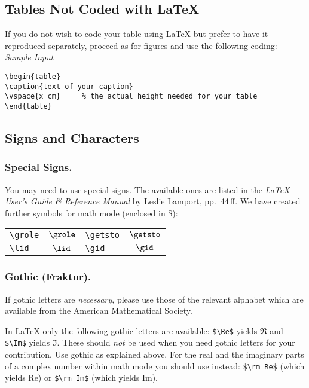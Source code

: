 \subsection{Tables Not Coded with \protect\LaTeX{}}
%
If you do not wish to code your table using \LaTeX{}
but prefer to have it reproduced separately,
proceed as for figures and use the following coding:\\[2mm]
{\it Sample Input}
\begin{verbatim}
\begin{table}
\caption{text of your caption}
\vspace{x cm}     % the actual height needed for your table
\end{table}
\end{verbatim}
%
\subsection{Signs and Characters}
%
\subsubsection*{Special Signs.}
%
You may need to use special signs.  The available ones are listed in the
{\em \LaTeX{} User's Guide \& Reference Manual\/} by Leslie Lamport,
pp.~44\,ff.
We have created further symbols for math mode (enclosed in \$):
\begin{center}
\begin{tabular}{l@{\hspace{1em}yields\hspace{1em}}
c@{\hspace{3em}}l@{\hspace{1em}yields\hspace{1em}}c}
\verb|\grole| & $\grole$ & \verb|\getsto| & $\getsto$\\
\verb|\lid|   & $\lid$   & \verb|\gid|    & $\gid$
\end{tabular}
\end{center}
%
\subsubsection*{Gothic (Fraktur).}
%
If gothic letters are {\it necessary}, please use those of the
relevant \AmSTeX{} alphabet which are available from the
American Mathematical Society.

In \LaTeX{} only the following gothic letters are available:
\verb|$\Re$| yields $\Re$ and \verb|$\Im$| yields $\Im$. These should
{\it not\/} be used when you need gothic letters for your contribution.
Use \AmSTeX{} gothic as explained above. For the real and the imaginary
parts of a complex number within math mode you should use instead:
\verb|$\rm Re$| (which yields Re) or \verb|$\rm Im$| (which yields Im).
%
